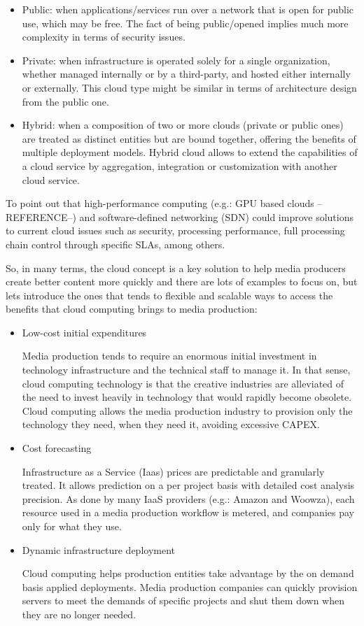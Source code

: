 \begin{itemize}
\item Public: when applications/services run over a network that is open for public use, which may be free. The fact of being public/opened implies much more complexity in terms of security issues.
\item Private: when infrastructure is operated solely for a single organization, whether managed internally or by a third-party, and hosted either internally or externally. This cloud type might be similar in terms of architecture design from the public one.
\item Hybrid: when a composition of two or more clouds (private or public ones) are treated as distinct entities but are bound together, offering the benefits of multiple deployment models. Hybrid cloud allows to extend the capabilities of a cloud service by aggregation, integration or customization with another cloud service.
\end{itemize}

To point out that high-performance computing (e.g.: GPU based clouds --REFERENCE--) and software-defined networking (SDN) could improve solutions to current cloud issues such as security, processing performance, full processing chain control through specific SLAs, among others.

So, in many terms, the cloud concept is a key solution to help media producers create better content more quickly and there are lots of examples to focus on, but lets introduce the ones that tends to flexible and scalable ways to access the benefits that cloud computing brings to media production:

\begin{itemize}
\item Low-cost initial expenditures \hfill 

Media production tends to require an enormous initial investment in technology infrastructure and the technical staff to manage it. In that sense, cloud computing technology is that the creative industries are alleviated of the need to invest heavily in technology that would rapidly become obsolete. Cloud computing allows the media production industry to provision only the technology they need, when they need it, avoiding excessive CAPEX.

\item Cost forecasting\hfill 

Infrastructure as a Service (Iaas) prices are predictable and granularly treated. It allows prediction on a per project basis with detailed cost analysis precision. As done by many IaaS providers (e.g.: Amazon and Woowza), each resource used in a media production workflow is metered, and companies pay only for what they use.

\item Dynamic infrastructure deployment \hfill 

Cloud computing helps production entities take advantage by the on demand basis applied deployments. Media production companies can quickly provision servers to meet the demands of specific projects and shut them down when they are no longer needed.
\end{itemize}

